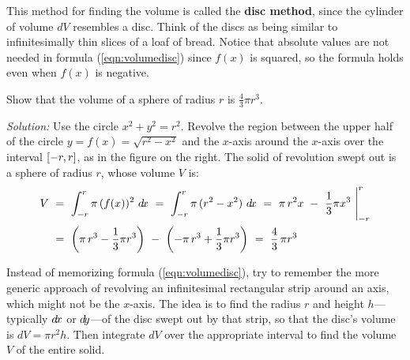 \noindent This method for finding the volume is called the \textbf{disc method},
since the cylinder of volume $d\!V$ resembles a disc. Think of the discs as
being similar to infinitesimally thin slices of a loaf of bread. Notice that
absolute values are not needed in formula (\ref{eqn:volumedisc}) since $f(x)$ is
squared, so the formula holds even when $f(x)$ is negative.
\newpage
\begin{exmp}
\noindent Show that the volume of a sphere of radius $r$ is
$\frac{4}{3} \pi r^3$.\vspace{0.5mm}
\par\noindent\emph{Solution:} Use the circle $x^2+y^2=r^2$. Revolve the region
between the upper half of the circle $y=f(x)=\sqrt{r^2-x^2}$ and the $x$-axis
around the $x$-axis over the interval $\lbrack -r,r \rbrack$, as in the figure on the
right. The solid of revolution swept out is a sphere of radius $r$, whose volume
$V$ is:
\begin{align*}
V ~&=~ \int_{-r}^r \pi\,(f(x))^2~d\!x ~=~
       \int_{-r}^r \pi\,(r^2-x^2)~d\!x ~=~
       \pi\,r^2 x ~-~ \frac{1}{3} \pi x^3~\Biggr|_{-r}^r\\
&=~    \left(\pi\,r^3 - \frac{1}{3} \pi r^3\right) ~-~ \left(-\pi\,r^3 + \frac{1}{3} \pi r^3\right)
~=~ \frac{4}{3}\,\pi r^3 \quad\relax
\end{align*}
\end{exmp}
\divider
\vspace{2mm}

Instead of memorizing formula (\ref{eqn:volumedisc}), try to remember the more
generic approach of revolving an infinitesimal rectangular strip around an axis,
which might not be the $x$-axis. The idea is to find the radius $r$ and height
$h$---typically $d\!x$ or $d\!y$---of the disc swept out by that strip, so that
the disc's volume is $d\!V = \pi r^2 h$. Then integrate $d\!V$ over the
appropriate interval to find the volume $V$ of the entire solid.

